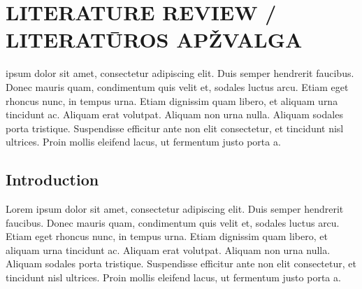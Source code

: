 


\setcounter{chapter}{0}
\chapter{\MakeUppercase{Literature review / Literatūros apžvalga}} %
\label{cha:review}

 ipsum dolor sit amet, consectetur adipiscing elit. Duis semper hendrerit faucibus. Donec mauris quam, condimentum quis velit et, sodales luctus arcu. Etiam eget rhoncus nunc, in tempus urna. Etiam dignissim quam libero, et aliquam urna tincidunt ac. Aliquam erat volutpat. Aliquam non urna nulla. Aliquam sodales porta tristique. Suspendisse efficitur ante non elit consectetur, et tincidunt nisl ultrices. Proin mollis eleifend lacus, ut fermentum justo porta a.


\section{Introduction}
\label{sec:introduction}

Lorem ipsum dolor sit amet, consectetur adipiscing elit. Duis semper hendrerit faucibus. Donec mauris quam, condimentum quis velit et, sodales luctus arcu. Etiam eget rhoncus nunc, in tempus urna. Etiam dignissim quam libero, et aliquam urna tincidunt ac. Aliquam erat volutpat. Aliquam non urna nulla. Aliquam sodales porta tristique. Suspendisse efficitur ante non elit consectetur, et tincidunt nisl ultrices. Proin mollis eleifend lacus, ut fermentum justo porta a.

